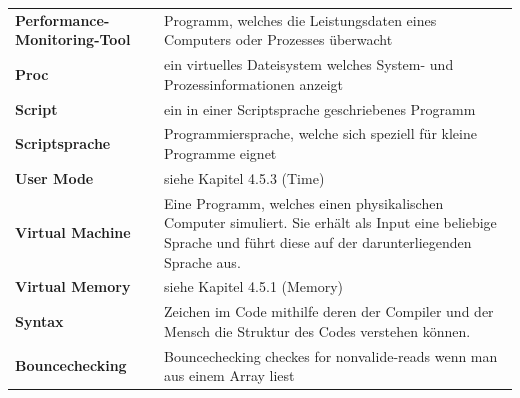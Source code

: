 \documentclass{fancydocument}
\begin{document}
\begin{tabularx}{\linewidth}{p{6.5cm}X}
\textbf{Performance-Monitoring-Tool}&Programm, welches die Leistungsdaten eines Computers oder Prozesses überwacht\\
\textbf{Proc}&ein virtuelles Dateisystem welches System- und Prozessinformationen anzeigt\\
\textbf{Script}&ein in einer Scriptsprache geschriebenes Programm\\
\textbf{Scriptsprache}&Programmiersprache, welche sich speziell für kleine Programme eignet\\
\textbf{User Mode}&siehe Kapitel 4.5.3 (Time)\\
\textbf{Virtual Machine}&Eine Programm, welches einen physikalischen Computer simuliert. Sie erhält als Input eine beliebige Sprache und führt
diese auf der darunterliegenden Sprache aus.\\
\textbf{Virtual Memory}&siehe Kapitel 4.5.1 (Memory)\\
\textbf{Syntax}&Zeichen im Code mithilfe deren der Compiler und der
Mensch die Struktur des Codes verstehen k\"onnen.\\
\textbf{Bouncechecking}& Bouncechecking checkes for nonvalide-reads
wenn man aus einem Array liest\\
\end{tabularx}
\end{document}
